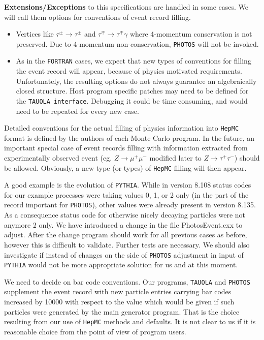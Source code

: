 \documentclass[]{Photos_interface_design}
\begin{document}
\noindent
\textbf{ Extensions/Exceptions} to this specifications  are handled in some cases. We will call them
options for conventions of event record filling.
  \begin{itemize} 
    \item  Vertices like $\tau^\pm \rightarrow \tau^\pm$ and $\tau^\mp \rightarrow \tau^\mp \gamma$ 
           where 4-momentum conservation is not preserved. Due to 4-momentum non-conservation,
           {\tt PHOTOS} will not be invoked.
    \item
           As in the {\tt FORTRAN} cases, we expect that  new  types of 
           conventions for filling the event record
           will appear, because of physics motivated requirements.
           Unfortunately, the resulting options do not always guarantee
           an algebraically closed structure.  
           Host program specific patches  may need to be defined for the 
           {\tt TAUOLA interface}. 
           Debugging it could be time consuming, and would need to be repeated for every new
           case.
   \end{itemize}


Detailed
conventions for the actual filling of physics information into {\tt HepMC} format
is defined by the authors of each Monte Carlo program.
 In the future,  an important special case of event records filling with
information extracted from experimentally observed event (eg. $Z\to \mu^+\mu^-$
 modified later to $Z\to \tau^+\tau^-$) should be allowed.
  Obviously, a new type (or types) of {\tt HepMC} filling will then appear.

A good example is the evolution of {\tt PYTHIA}. While in version 8.108 status codes for 
our example processes were  taking values 0, 1, or 2  only (in the part of the record 
important for {\tt PHOTOS}), other values were already present in
version 8.135. As a consequence status code for 
otherwise nicely decaying particles were not anymore 2 only. We have introduced 
a change  in the file PhotosEvent.cxx to adjust. After  the change
program should work for all previous cases as before, however this is difficult to validate.
Further tests are necessary. We should also investigate 
if instead of changes on the side of  {\tt PHOTOS} adjustment in input of {\tt PYTHIA} would not 
be more appropriate 
solution for us and at this moment.

We need to decide on bar code conventions. Our programs, {\tt TAUOLA} and
 {\tt PHOTOS} supplement the event record with new particle entries carrying bar codes 
increased by 10000 with respect to the value which would be given if such 
particles were generated by the main generator program. 
That is the choice resulting from our use 
of {\tt HepMC} methods and defaults.  It is not clear to us if it is 
reasonable choice from the point of view of program users.
\end{document}
